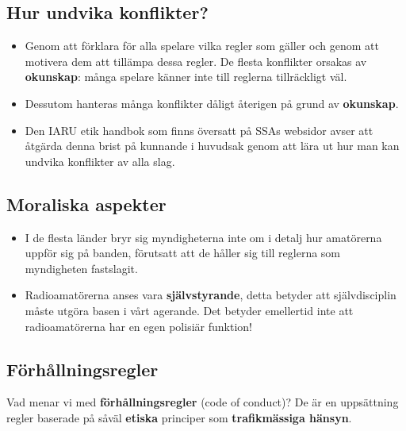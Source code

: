 \subsection{Hur undvika konflikter?}
\begin{itemize}
\item Genom att förklara för alla spelare vilka regler som gäller och genom
  att motivera dem att tillämpa dessa regler. De flesta konflikter orsakas
  av \textbf{okunskap}: många spelare känner inte till reglerna
  tillräckligt väl.

\item Dessutom hanteras många konflikter dåligt återigen på grund av
  \textbf{okunskap}.

\item Den IARU etik handbok som finns översatt på SSAs websidor avser att
  åtgärda denna brist på kunnande i huvudsak genom att lära ut hur man kan
  undvika konflikter av alla slag.
\end{itemize}

\subsection{Moraliska aspekter}
\begin{itemize}
\item I de flesta länder bryr sig myndigheterna inte om i detalj hur
  amatörerna uppför sig på banden, förutsatt att de håller sig till reglerna
  som myndigheten fastslagit.
\item Radioamatörerna anses vara \textbf{självstyrande}, detta betyder att
  självdisciplin måste utgöra basen i vårt agerande. Det betyder emellertid
  inte att radioamatörerna har en egen polisiär funktion!
\end{itemize}

\subsection{Förhållningsregler}

Vad menar vi med \textbf{förhållningsregler} (code of conduct)? De är en
uppsättning regler baserade på såväl \textbf{etiska} principer som
\textbf{trafikmässiga hänsyn}.


